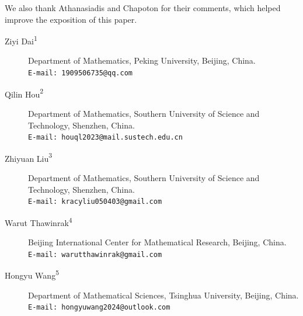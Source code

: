 \documentclass[11pt,a4paper]{article}
\newcommand{\1}{\mathbf{1}}
\theoremstyle{plain}
\theoremstyle{definition}
\begin{document}
We also thank Athanasiadis and Chapoton for their comments, which helped improve the exposition of this paper.






\begin{description}
        \item[Ziyi Dai\hypertarget{author1}{\textsuperscript{1}}] Department of Mathematics, Peking University, Beijing, China. \\ \texttt{E-mail: 1909506735@qq.com}
    \item[Qilin Hou\hypertarget{author2}{\textsuperscript{2}}] Department of Mathematics, Southern University of Science and Technology, Shenzhen, China.\\ 
    \texttt{E-mail: houql2023@mail.sustech.edu.cn}
    \item[Zhiyuan Liu\hypertarget{author3}{\textsuperscript{3}}] Department of Mathematics, Southern University of Science and Technology, Shenzhen, China. \\ \texttt{E-mail: kracyliu050403@gmail.com}
    \item[Warut Thawinrak\hypertarget{author4}{\textsuperscript{4}}] Beijing International Center for Mathematical Research, Beijing, China. \\ \texttt{E-mail: warutthawinrak@gmail.com}
    \item[Hongyu Wang\hypertarget{author5}{\textsuperscript{5}}] Department of Mathematical Sciences, Tsinghua University, Beijing, China. \\ \texttt{E-mail: hongyuwang2024@outlook.com}
\end{description}
\end{document}
